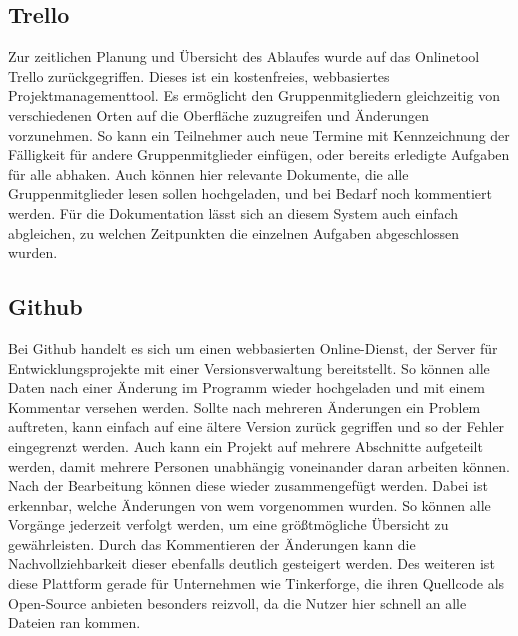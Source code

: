 
\subsection{Trello}
Zur zeitlichen Planung und Übersicht des Ablaufes wurde auf das Onlinetool Trello zurückgegriffen. Dieses ist ein kostenfreies, webbasiertes Projektmanagementtool. Es ermöglicht den Gruppenmitgliedern gleichzeitig von verschiedenen Orten auf die Oberfläche zuzugreifen und Änderungen vorzunehmen. So kann ein Teilnehmer auch neue Termine mit Kennzeichnung der Fälligkeit für andere Gruppenmitglieder einfügen, oder bereits erledigte Aufgaben für alle abhaken. Auch können hier relevante Dokumente, die alle Gruppenmitglieder lesen sollen hochgeladen, und bei Bedarf noch kommentiert werden. Für die Dokumentation lässt sich an diesem System auch einfach abgleichen, zu welchen Zeitpunkten die einzelnen Aufgaben abgeschlossen wurden.
\subsection{Github}
Bei Github handelt es sich um einen webbasierten Online-Dienst, der Server für Entwicklungsprojekte mit einer Versionsverwaltung bereitstellt. So können alle Daten nach einer Änderung im Programm wieder hochgeladen und mit einem Kommentar versehen werden. Sollte nach mehreren Änderungen ein Problem auftreten, kann einfach auf eine ältere Version zurück gegriffen und so der Fehler eingegrenzt werden. Auch kann ein Projekt auf mehrere Abschnitte aufgeteilt werden, damit mehrere Personen unabhängig voneinander daran arbeiten können. Nach der Bearbeitung können diese wieder zusammengefügt werden. Dabei ist erkennbar, welche Änderungen von wem vorgenommen wurden. So können alle Vorgänge jederzeit verfolgt werden, um eine größtmögliche Übersicht zu gewährleisten. Durch das Kommentieren der Änderungen kann die Nachvollziehbarkeit dieser ebenfalls deutlich gesteigert werden. Des weiteren ist diese Plattform gerade für Unternehmen wie Tinkerforge, die ihren Quellcode als Open-Source anbieten besonders reizvoll, da die Nutzer hier schnell an alle Dateien ran kommen.